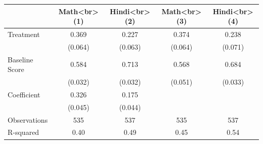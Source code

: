 \begin{table}[t]
\fontsize{12.0pt}{14.0pt}\selectfont
\begin{tabular*}{\linewidth}{@{\extracolsep{\fill}}lcccc}
\toprule
{\mdseries  } & Math<br>(1) & Hindi<br>(2) & Math<br>(3) & Hindi<br>(4) \\ 
\midrule\addlinespace[2.5pt]
Treatment & 0.369 & 0.227 & 0.374 & 0.238 \\ 
 & (0.064) & (0.063) & (0.064) & (0.071) \\ 
Baseline Score & 0.584 & 0.713 & 0.568 & 0.684 \\ 
 & (0.032) & (0.032) & (0.051) & (0.033) \\ 
Coefficient & 0.326 & 0.175 &  &  \\ 
{} & {(0.045)} & {(0.044)} & {} & {} \\ 
Observations & 535 & 537 & 535 & 537 \\ 
R-squared & 0.40 & 0.49 & 0.45 & 0.54 \\ 
\bottomrule
\end{tabular*}
\end{table}

